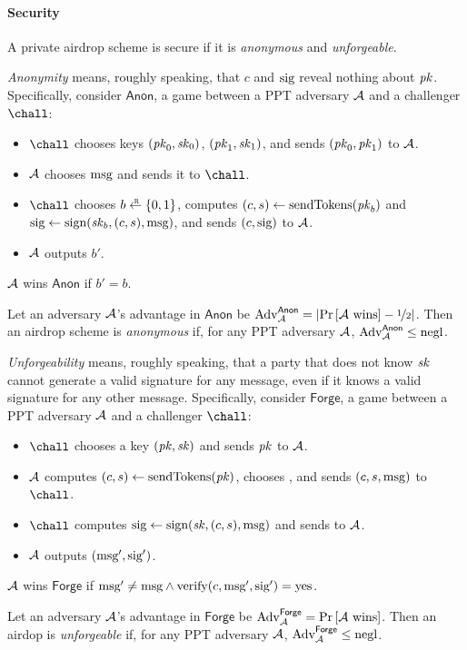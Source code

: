 \paragraph{Security} A private airdrop scheme is secure if it is \emph{anonymous} and \emph{unforgeable}.

\medskip\noindent\textit{Anonymity} means, roughly speaking, that $c$ and $\text{sig}$ reveal
    nothing about $\mathit{pk}$.
Specifically, consider $\mathsf{Anon}$, a game between a PPT adversary $\mathcal{A}$
    and a challenger $\chall$:
%
\begin{itemize}
\item $\chall$ chooses keys $(\mathit{pk}_0, \mathit{sk}_0)$, $(\mathit{pk}_1, \mathit{sk}_1)$, and sends $(\mathit{pk}_0, \mathit{pk}_1)$ to $\mathcal{A}$.

\item $\mathcal{A}$ chooses $\text{msg}$ and sends it to $\chall$.

\item $\chall$ chooses $b \rgets \{0,1\}$,
computes $(c, s) \gets \text{sendTokens}(\mathit{pk}_b)$ and
$\text{sig} \gets \text{sign}(\mathit{sk}_b, (c, s), \text{msg})$,
and sends $(c, \text{sig})$ to $\mathcal{A}$.

\item $\mathcal{A}$ outputs $b'$.

\end{itemize}
%
$\mathcal{A}$ wins $\mathsf{Anon}$ if $b' = b$.

\begin{definition}
Let an adversary $\mathcal{A}$'s advantage in $\mathsf{Anon}$ be
$\mathrm{Adv}_{\mathcal{A}}^{\mathsf{Anon}} = \left|{\operatorname*{Pr}\left[{\mathcal{A}~\text{wins}}\right] - \nicefrac{1}{2}}\right|$.
Then an airdrop scheme is \emph{anonymous} if, for any PPT adversary
    $\mathcal{A}$, $\mathrm{Adv}_{\mathcal{A}}^{\mathsf{Anon}} \le \text{negl}$.
\end{definition}


\medskip\noindent\textit{Unforgeability} means, roughly speaking, that
    a party that does not know $\mathit{sk}$ cannot generate a valid signature
    for any message, even if it knows a valid signature for any other
    message.
Specifically, consider $\mathsf{Forge}$, a game between a PPT adversary
    $\mathcal{A}$ and a challenger $\chall$:
%
\begin{itemize}
\item $\chall$ chooses a key $(\mathit{pk}, \mathit{sk})$ and sends $\mathit{pk}$ to $\mathcal{A}$.

\item $\mathcal{A}$ computes $(c, s) \gets \text{sendTokens}(\mathit{pk})$, chooses \msg, and sends $(c, s, \text{msg})$ to $\chall$.

\item $\chall$ computes $\text{sig} \gets \text{sign}(\mathit{sk}, (c, s), \text{msg})$ and sends to $\mathcal{A}$.

\item $\mathcal{A}$ outputs $(\text{msg}', \text{sig}')$.

\end{itemize}
%
$\mathcal{A}$ wins $\mathsf{Forge}$ if $\text{msg}' \neq \text{msg} \wedge \text{verify}(c, \text{msg}', \text{sig}') = \text{yes}$.

\begin{definition}
Let an adversary $\mathcal{A}$'s advantage in $\mathsf{Forge}$ be
$\mathrm{Adv}_{\mathcal{A}}^{\mathsf{Forge}} = \operatorname*{Pr}\left[{\mathcal{A}~\text{wins}}\right]$.
Then an airdop is \emph{unforgeable} if, for any PPT adversary $\mathcal{A}$,
$\mathrm{Adv}_{\mathcal{A}}^{\mathsf{Forge}} \le \text{negl}$.
\end{definition}

